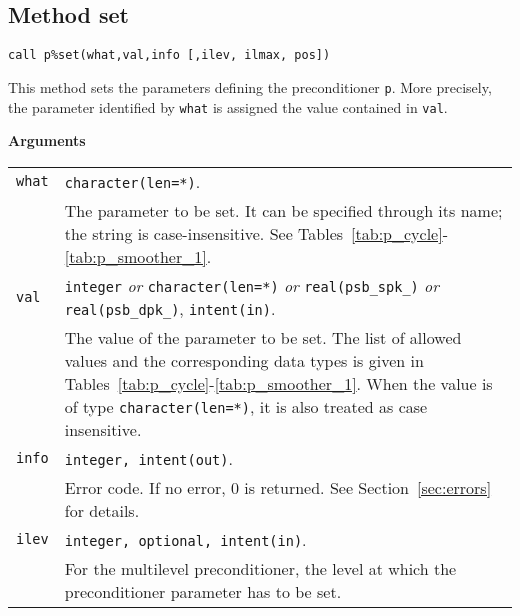 \clearpage

\subsection{Method set\label{sec:precset}}

\begin{center}
\verb|call p%set(what,val,info [,ilev, ilmax, pos])|
\end{center}

\noindent
This method sets the parameters defining the preconditioner \verb|p|. More
precisely, the parameter identified by \verb|what| is assigned the value
contained in \verb|val|. 

{\baselineskip\noindent\large\bfseries Arguments} \smallskip

\begin{tabular}{p{1.2cm}p{12cm}}
\verb|what|   & \verb|character(len=*)|. \\
              & The parameter to be set. It can be specified through its name;
                the string is case-insensitive. See
                Tables~\ref{tab:p_cycle}-\ref{tab:p_smoother_1}.\\ 
\verb|val |   & \verb|integer| \emph{or} \verb|character(len=*)| \emph{or}
                \verb|real(psb_spk_)| \emph{or} \verb|real(psb_dpk_)|,
                \verb|intent(in)|.\\
              & The value of the parameter to be set. The list of allowed
                values and the corresponding data types is given in
                Tables~\ref{tab:p_cycle}-\ref{tab:p_smoother_1}.
                When the value is of type \verb|character(len=*)|,
                it is also treated as case insensitive.\\
\verb|info|   & \verb|integer, intent(out)|.\\
              & Error code. If no error, 0 is returned. See Section~\ref{sec:errors}
                for details.\\
\verb|ilev|   & \verb|integer, optional, intent(in)|.\\
              & For the multilevel preconditioner, the level at which the
                preconditioner parameter has to be set.

\end{tabular}
